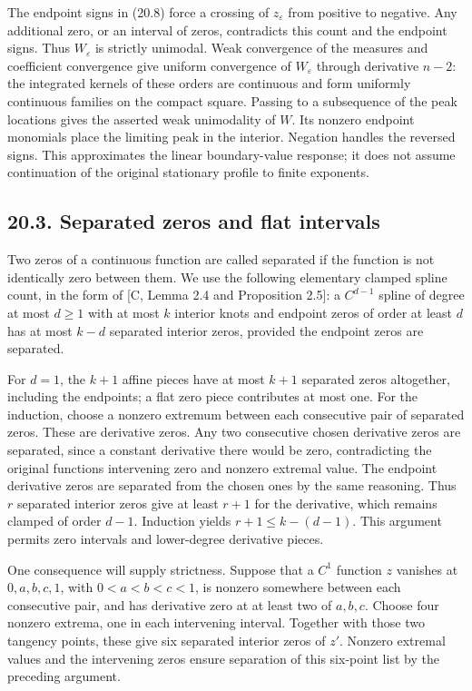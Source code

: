 \documentclass[11pt]{article}
\begin{document}
The endpoint signs in (20.8) force a crossing of \(z_\varepsilon\) from
positive to negative. Any additional zero, or an interval of zeros,
contradicts this count and the endpoint signs. Thus \(W_\varepsilon\) is
strictly unimodal. Weak convergence of the measures and coefficient
convergence give uniform convergence of \(W_\varepsilon\) through
derivative \(n-2\): the integrated kernels of these orders are
continuous and form uniformly continuous families on the compact square.
Passing to a subsequence of the peak locations gives the asserted weak
unimodality of \(W\). Its nonzero endpoint monomials place the limiting
peak in the interior. Negation handles the reversed signs. This
approximates the linear boundary-value response; it does not assume
continuation of the original stationary profile to finite exponents.

\subsection{20.3. Separated zeros and flat
intervals}\label{separated-zeros-and-flat-intervals}

Two zeros of a continuous function are called separated if the function
is not identically zero between them. We use the following elementary
clamped spline count, in the form of {[}C, Lemma 2.4 and Proposition
2.5{]}: a \(C^{d-1}\) spline of degree at most \(d\ge1\) with at most
\(k\) interior knots and endpoint zeros of order at least \(d\) has at
most \(k-d\) separated interior zeros, provided the endpoint zeros are
separated.

For \(d=1\), the \(k+1\) affine pieces have at most \(k+1\) separated
zeros altogether, including the endpoints; a flat zero piece contributes
at most one. For the induction, choose a nonzero extremum between each
consecutive pair of separated zeros. These are derivative zeros. Any two
consecutive chosen derivative zeros are separated, since a constant
derivative there would be zero, contradicting the original
function\textquotesingle s intervening zero and nonzero extremal value.
The endpoint derivative zeros are separated from the chosen ones by the
same reasoning. Thus \(r\) separated interior zeros give at least
\(r+1\) for the derivative, which remains clamped of order \(d-1\).
Induction yields \(r+1\le k-(d-1)\). This argument permits zero
intervals and lower-degree derivative pieces.

One consequence will supply strictness. Suppose that a \(C^1\) function
\(z\) vanishes at \(0,a,b,c,1\), with \(0<a<b<c<1\), is nonzero
somewhere between each consecutive pair, and has derivative zero at at
least two of \(a,b,c\). Choose four nonzero extrema, one in each
intervening interval. Together with those two tangency points, these
give six separated interior zeros of \(z'\). Nonzero extremal values and
the intervening zeros ensure separation of this six-point list by the
preceding argument.
\end{document}
